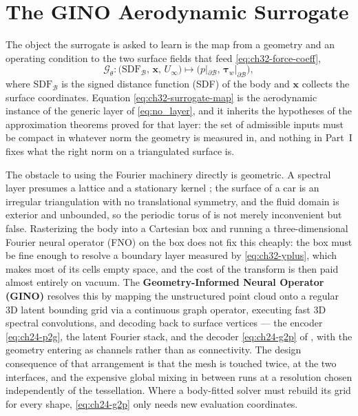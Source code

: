 \section{The GINO Aerodynamic Surrogate}
\label{sec:ch32-gino}

The object the surrogate is asked to learn is the map from a geometry and an operating condition
to the two surface fields that feed \eqref{eq:ch32-force-coeff},
\begin{equation}
  \label{eq:ch32-surrogate-map}
  \mathcal{G}_\theta : \big( \mathrm{SDF}_{\mathcal{B}},\, \mathbf{x},\, U_\infty \big)
  \longmapsto \big( p|_{\partial\mathcal{B}},\, \boldsymbol{\tau}_w|_{\partial\mathcal{B}} \big),
\end{equation}
where $\mathrm{SDF}_{\mathcal{B}}$ is the signed distance function (SDF) of the body and
$\mathbf{x}$ collects the surface coordinates.
Equation \eqref{eq:ch32-surrogate-map} is the
aerodynamic instance of the generic layer of \eqref{eq:no_layer}, and it inherits the hypotheses
of the approximation theorems proved for that layer: the set of admissible inputs must be compact
in whatever norm the geometry is measured in, and nothing in Part~I fixes what the right norm on a
triangulated surface is.

The obstacle to using the Fourier machinery directly is geometric. A spectral layer presumes a
lattice and a stationary kernel \cite{kovachki2023neural,li2021fourier}; the surface of a car is
an irregular triangulation with no translational symmetry, and the fluid domain is exterior and
unbounded, so the periodic torus of 
is not merely inconvenient but false. Rasterizing the body into a Cartesian box and running a
three-dimensional Fourier neural operator (FNO) on the box does not fix this cheaply: the box
must be fine enough to
resolve a boundary layer measured by \eqref{eq:ch32-yplus}, which makes most of its cells
empty space, and the cost of the transform is then paid almost entirely on vacuum. The
\textbf{Geometry-Informed Neural Operator (GINO)}
\cite{li2023geometry}
resolves this by mapping
the unstructured point cloud onto a regular 3D latent bounding grid via a continuous graph
operator, executing fast 3D spectral convolutions, and decoding back to surface vertices --- the
encoder \eqref{eq:ch24-p2g}, the latent Fourier stack, and the decoder \eqref{eq:ch24-g2p} of
, with the geometry entering as
channels rather than as connectivity. The design consequence of that arrangement is that the
mesh is touched twice, at the two interfaces, and the expensive global mixing in between runs at
a resolution chosen independently of the tessellation. Where a body-fitted solver must rebuild
its grid for every shape, \eqref{eq:ch24-g2p} only needs new evaluation coordinates.

